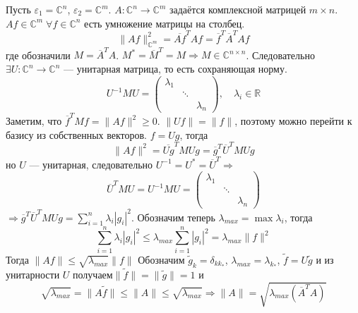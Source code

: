 \documentclass[14pt]{extarticle}
\begin{document}
\begin{Prim}
    Пусть $\varepsilon_1 = \mathbb C^n$, $\varepsilon_2 = \mathbb C^m$.
    $A : \mathbb C^n \to \mathbb C^m$ задаётся комплексной матрицей $m \times n$.
    $Af \in \mathbb C^m\; \forall f \in \mathbb C^n$ есть умножение матрицы на столбец.
    $$
    \|Af\|^2_{\mathbb C^m} = \overline{Af}^T Af = \overline{f}^T \overline{A}^T A f
    $$
    где обозначили $M = \overline{A}^T A$. 
    $M^*=\overline{M}^T=M \Rightarrow  M \in \mathbb C^{n \times n}$.
    Следовательно $\exists U : \mathbb C^n \to \mathbb C^n$ --- унитарная матрица, то есть сохраняющая норму.
    $$
    U^{-1}MU =
    \left(
        \begin{array}{ccc}
            \lambda_1 & \phantom{x} & \phantom{x}\\
            \phantom{x} & \ddots & \phantom{x}\\
            \phantom{x} & \phantom{x} & \lambda_n
        \end{array}
    \right), \quad \lambda_i \in \mathbb R
    $$
    Заметим, что $\overline{f}^TMf = \|Af\|^2 \ge 0$.
    $\|Uf\|=\|f\|$, поэтому можно перейти к базису из собственных векторов.
    $f=Ug$, тогда
    $$
    \|Af\|^2 = \overline{Ug}^TM Ug = \overline{g}^T \overline{U}^T M Ug
    $$
     но $U$ --- унитарная, следовательно
    $U^{-1} = U^* = \overline{U}^T \Rightarrow$
    $$
    \overline{U}^T M U = U^{-1} M U =
    \left(
        \begin{array}{ccc}
            \lambda_1 & \phantom{x} & \phantom{x}\\
            \phantom{x} & \ddots & \phantom{x}\\
            \phantom{x} & \phantom{x} & \lambda_n
        \end{array}
    \right)
    $$
    $\Rightarrow \overline{g}^T \overline{U}^T M Ug = \sum\limits_{i = 1}^n \lambda_i |g_i|^2$.
    Обозначим теперь $\lambda_{max} = \max\lambda_i$, тогда 
    $$
    \sum\limits_{i = 1}^n \lambda_i |g_i|^2 \le \lambda_{max}\sum\limits_{i = 1}^n |g_i|^2 = \lambda_{max} \|f\|^2
    $$
    Тогда $\|Af\| \le \sqrt{\lambda_{max}}\|f\|$
    Обозначим $\tilde{g}_k = \delta_{kk_*}$, $\lambda_{max} = \lambda_{k_*}$, $\tilde{f} = U\tilde{g}$ и из унитарности $U$ получаем$\|\tilde{f}\| = \|\tilde{g}\| = 1$ и 
    $$
    \sqrt{\lambda_{max}} = \|A\tilde{f}\| \le \|A\| \le \sqrt{\lambda_{max}} \Rightarrow \|A\| = \sqrt{\lambda_{max}(\overline{A}^T A)}
    $$
\end{Prim}
\end{document}
